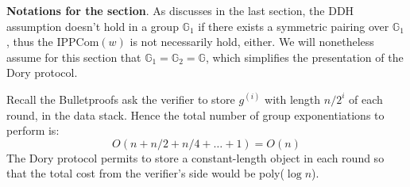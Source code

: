 \documentclass{article}
\begin{document}
\textbf{Notations for the section}. As discusses in the last section, the DDH assumption doesn't hold in a group $\mathbb{G}_1$ if there exists a symmetric pairing over $\mathbb{G}_1$, thus the $\text{IPPCom}(w)$ is not necessarily hold, either. We will nonetheless assume for this section that $\mathbb{G}_1 = \mathbb{G}_2 = \mathbb{G}$, which simplifies the presentation of the Dory protocol. 

Recall the Bulletproofs ask the verifier to store $g^{(i)}$ with length $n/2^i$ of each round, in the data stack. Hence the total number of group exponentiations to perform is:
\begin{equation*}
O(n + n/2 + n/4 + \dots + 1) = O(n)
\end{equation*}
The Dory protocol permits to store a constant-length object in each round so that the total cost from the verifier's side would be poly($\log n$). 
\end{document}
